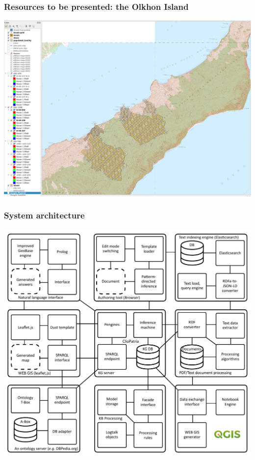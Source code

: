 \documentclass[10pt]{beamer}
\begin{document}
\begin{frame}
  \frametitle{Resources to be presented:  the Olkhon Island}
  \centering
   \includegraphics[width=\linewidth]{olkhon-gis.png}
\end{frame}

\begin{frame}
  \frametitle{System architecture}
  \centering
  \includegraphics[width=0.8\linewidth]{architecture.pdf}
\end{frame}
\end{document}
